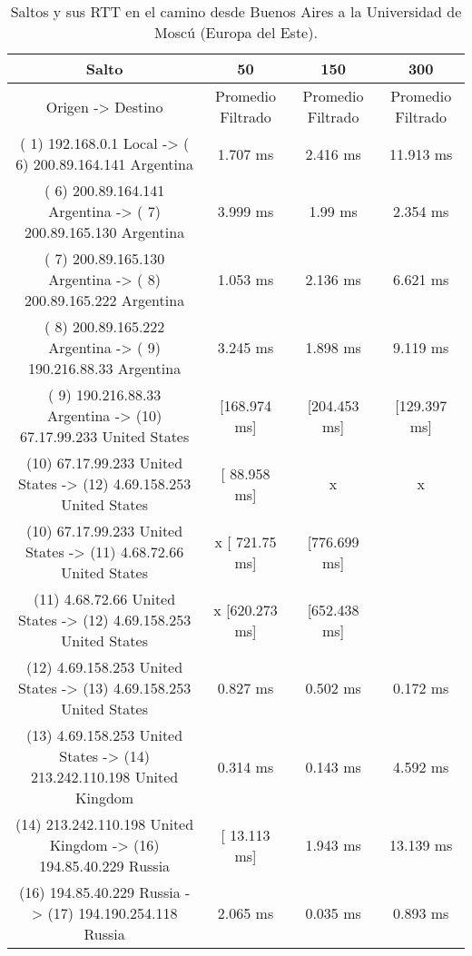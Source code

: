\begin{table}[]
\centering
\caption{Saltos y sus RTT en el camino desde Buenos Aires a la Universidad de Moscú (Europa del Este).}
\begin{tabular}{ | c | c | c | c | }
	\hline 
Salto	& 50	& 150	& 300 \\ \hline
Origen                ->               Destino               	                 & Promedio Filtrado	 & Promedio Filtrado&	Promedio Filtrado\\ \hline
( 1) 192.168.0.1     Local           -> ( 6) 200.89.164.141  Argentina     & 	     1.707 ms   	 &    2.416 ms   	  &  11.913 ms   \\ \hline
( 6) 200.89.164.141  Argentina       -> ( 7) 200.89.165.130  Argentina     & 	     3.999 ms   	 &     1.99 ms   	  &   2.354 ms   \\ \hline
( 7) 200.89.165.130  Argentina       -> ( 8) 200.89.165.222  Argentina     & 	     1.053 ms   	 &    2.136 ms   	  &   6.621 ms   \\ \hline
( 8) 200.89.165.222  Argentina       -> ( 9) 190.216.88.33   Argentina     & 	     3.245 ms   	 &    1.898 ms   	  &   9.119 ms   \\ \hline
( 9) 190.216.88.33   Argentina       -> (10) 67.17.99.233    United States & 	  [168.974 ms]  	 & [204.453 ms]  	  &[129.397 ms]  \\ \hline
(10) 67.17.99.233    United States   -> (12) 4.69.158.253    United States  	 & [ 88.958 ms]       &      	x	         &    x\\ \hline
(10) 67.17.99.233    United States   -> (11) 4.68.72.66      United States & 	x	  [ 721.75 ms]  &	  [776.699 ms]  & \\ \hline
(11) 4.68.72.66      United States   -> (12) 4.69.158.253    United States & 	x	  [620.273 ms]  &	  [652.438 ms]  & \\ \hline
(12) 4.69.158.253    United States   -> (13) 4.69.158.253    United States & 	     0.827 ms   	 &    0.502 ms   	  &   0.172 ms   \\ \hline
(13) 4.69.158.253    United States   -> (14) 213.242.110.198 United Kingdom& 	     0.314 ms   	 &    0.143 ms   	  &   4.592 ms   \\ \hline
(14) 213.242.110.198 United Kingdom  -> (16) 194.85.40.229   Russia        & 	  [ 13.113 ms]  	 &    1.943 ms   	  &  13.139 ms   \\ \hline
(16) 194.85.40.229   Russia          -> (17) 194.190.254.118 Russia        & 	     2.065 ms   	 &    0.035 ms   	  &   0.893 ms   \\ \hline

\end{tabular}
\end{table}
